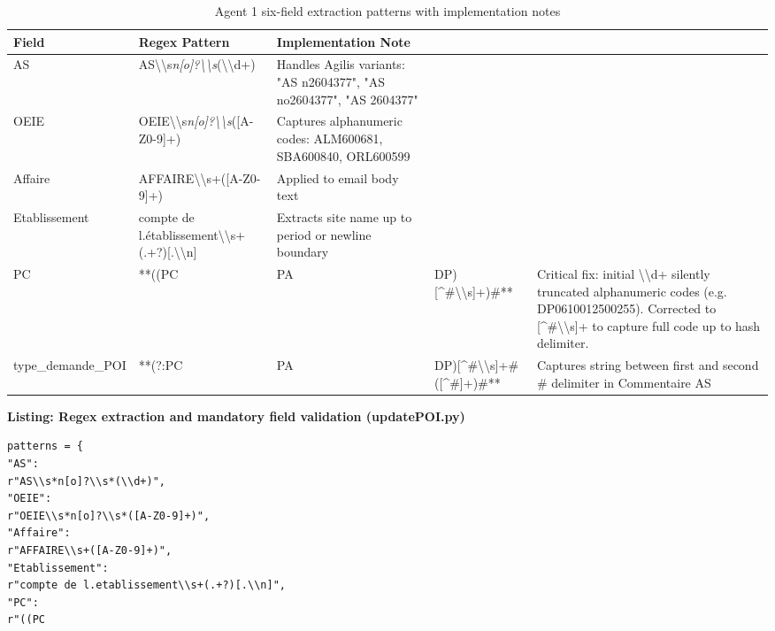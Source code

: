 \begin{table}[H]
  \centering
  \caption{Agent 1 six-field extraction patterns with implementation notes}
  \renewcommand{\arraystretch}{1.0}
  \footnotesize
  \begin{tabularx}{\textwidth}{|X|X|X|X|X|}
    \hline
    \textbf{Field} & \textbf{Regex Pattern} & \textbf{Implementation Note} & \textbf{} & \textbf{} \\ \hline
    AS & AS\textbackslash{}\textbackslash{}s\textit{n[\textdegree{}o]?\textbackslash{}\textbackslash{}s}(\textbackslash{}\textbackslash{}d+) & Handles Agilis variants: "AS n\textdegree{}2604377", "AS no2604377", "AS 2604377" &  &  \\ \hline
    OEIE & OEIE\textbackslash{}\textbackslash{}s\textit{n[\textdegree{}o]?\textbackslash{}\textbackslash{}s}([A-Z0-9]+) & Captures alphanumeric codes: ALM600681, SBA600840, ORL600599 &  &  \\ \hline
    Affaire & AFFAIRE\textbackslash{}\textbackslash{}s+([A-Z0-9]+) & Applied to email body text &  &  \\ \hline
    Etablissement & compte de l.établissement\textbackslash{}\textbackslash{}s+(.+?)[.\textbackslash{}\textbackslash{}n] & Extracts site name up to period or newline boundary &  &  \\ \hline
    PC & **((PC & PA & DP)[\textasciicircum{}\#\textbackslash{}\textbackslash{}s]+)\#** & Critical fix: initial \textbackslash{}\textbackslash{}d+ silently truncated alphanumeric codes (e.g. DP0610012500255). Corrected to [\textasciicircum{}\#\textbackslash{}\textbackslash{}s]+ to capture full code up to hash delimiter. \\ \hline
    type\_demande\_POI & **(?:PC & PA & DP)[\textasciicircum{}\#\textbackslash{}\textbackslash{}s]+\#([\textasciicircum{}\#]+)\#** & Captures string between first and second \# delimiter in Commentaire AS \\ \hline
  \end{tabularx}
\end{table}

\begin{center}\small\textbf{Listing: Regex extraction and mandatory field validation (updatePOI.py)}\end{center}
\begin{Verbatim}[breaklines=true,fontsize=\footnotesize,frame=single]
patterns = {
"AS":
r"AS\\s*n[o]?\\s*(\\d+)",
"OEIE":
r"OEIE\\s*n[o]?\\s*([A-Z0-9]+)",
"Affaire":
r"AFFAIRE\\s+([A-Z0-9]+)",
"Etablissement":
r"compte de l.etablissement\\s+(.+?)[.\\n]",
"PC":
r"((PC
\end{Verbatim}

